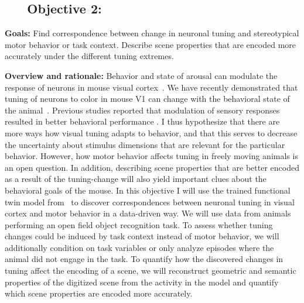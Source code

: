 \documentclass[B2,COG]{ercgrant}
\begin{document}
\subsection{\colorbox{obj2}{\textcolor{white}{O2}} Objective 2: \otwotitle}


\textbf{Goals:} Find correspondence between change in neuronal tuning and stereotypical motor behavior or task context.
Describe scene properties that are encoded more accurately under the different tuning extremes. 

\textbf{Overview and rationale:} 
Behavior and state of arousal can modulate the response of neurons in mouse visual cortex~\parencite{Niell2010-bs, Stringer2019-lt, Musall2019-kd}.
We have recently demonstrated that tuning of neurons to color in mouse V1 can change with the behavioral state of the animal~\parencite{Franke2022-do}.
Previous studies reported that modulation of sensory responses resulted in better behavioral performance \parencite{Spitzer1988-kq, Bennett2013-rk, Dadarlat2017-jw, De_Gee2022-ir}.
I thus hypothesize that there are more ways how visual tuning adapts to behavior, and that this serves to decrease the uncertainty about stimulus dimensions that are relevant for the particular behavior. 
However, how motor behavior affects tuning in freely moving animals is an open question.
In addition, describing scene properties that are better encoded as a result of the tuning-change will also yield important clues about the behavioral goals of the mouse. 
In this objective I will use the trained functional twin model from~ to discover correspondences between neuronal tuning in visual cortex and motor behavior in a data-driven way. 
We will use data from animals performing an open field object recognition task. 
To assess whether tuning changes could be induced by task context instead of motor behavior, we will additionally condition on task variables or only analyze episodes where the animal did not engage in the task. 
To quantify how the discovered changes in tuning affect the encoding of a scene, we will reconstruct geometric and semantic properties of the digitized scene from the activity in the model and quantify which scene properties are encoded more accurately. 
\end{document}
